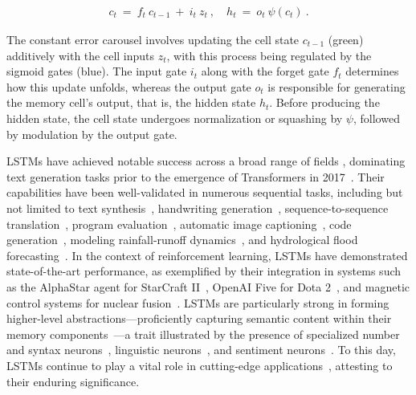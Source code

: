 \begin{align}
\label{eq:lstm_idea}
  c_t \ = \ f_t \ c_{t-1} \ + \ 
          i_t \  z_t \ , \quad  
          h_t \ = \ o_t \ \psi({c_t}) \ . 
\end{align}

The constant error carousel involves updating the cell state $c_{t-1}$ (green) additively with the cell inputs $z_t$, with this process being regulated by the sigmoid gates (blue). The input gate $i_t$ along with the forget gate $f_t$ determines how this update unfolds, whereas the output gate $o_t$ is responsible for generating the memory cell's output, that is, the hidden state $h_t$. Before producing the hidden state, the cell state undergoes normalization or squashing by $\psi$, followed by modulation by the output gate.

LSTMs have achieved notable success across a broad range of fields \citep{Hochreiter:01,Hochreiter:07,Schmidhuber:15}, dominating text generation tasks prior to the emergence of Transformers in 2017~\citep{Vaswani:17}. Their capabilities have been well-validated in numerous sequential tasks, including but not limited to text synthesis~\citep{Graves:13,Karpathy:15blog}, handwriting generation~\citep{Graves:13}, sequence-to-sequence translation~\citep{Sutskever:14nips}, program evaluation~\citep{Zaremba:14arxiv}, automatic image captioning~\citep{Karpathy:15,Hossain:19}, code generation~\citep{Karpathy:15blog}, modeling rainfall-runoff dynamics~\citep{Kratzert:18,Kratzert:19}, and hydrological flood forecasting~\citep{Nearing:24}. In the context of reinforcement learning, LSTMs have demonstrated state-of-the-art performance, as exemplified by their integration in systems such as the AlphaStar agent for StarCraft II~\citep{Vinyals:17short}, OpenAI Five for Dota 2~\citep{OpenAI:19}, and magnetic control systems for nuclear fusion~\citep{Degrave:22short}. LSTMs are particularly strong in forming higher-level abstractions—proficiently capturing semantic content within their memory components~\citep{Karpathy:15blog}—a trait illustrated by the presence of specialized number and syntax neurons~\citep{Lakretz:19}, linguistic neurons~\citep{Bau:19}, and sentiment neurons~\citep{Radford:17arxiv}. To this day, LSTMs continue to play a vital role in cutting-edge applications~\citep{Degrave:22short,Nearing:24}, attesting to their enduring significance.

